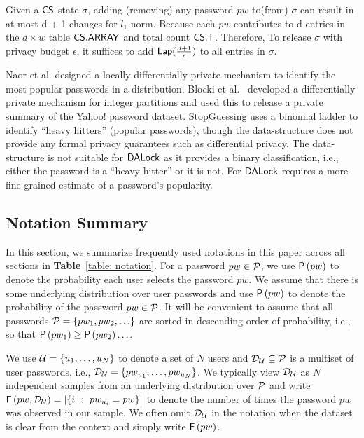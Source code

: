  Given a $\mathsf{CS}$ state $\sigma$, adding (removing) any password $pw$ to(from) $\sigma$ can result in at most d + 1 changes for $l_1$ norm. Because each $pw$ contributes to d entries in the $d \times w$ table $\mathsf{CS.ARRAY}$ and total count $\mathsf{CS.T}$. Therefore, To release $\sigma$ with privacy budget $\epsilon$, it suffices to add $\mathsf{Lap}(\frac{d+1}{\epsilon})$ to all entries in $\sigma$. 


 Naor et al.\cite{CCS:NaoPinRon19} designed a locally differentially private mechanism to identify the most popular passwords in a distribution. Blocki et al.~\cite{NDSS:BloDatBon16} developed a differentially private mechanism for integer partitions and used this to release a private summary of the Yahoo! password dataset. StopGuessing\cite{EuroSP:THS19} uses a binomial ladder to identify ``heavy hitters'' (popular passwords), though the data-structure does not provide any formal privacy guarantees such as differential privacy. The data-structure is not suitable for $\mathsf{DALock}$ as it provides a binary classification, i.e., either the password is a ``heavy hitter'' or it is not. For $\mathsf{DALock}$ requires a more fine-grained estimate of a password’s popularity. 



\subsection{Notation Summary}

In this section, we summarize frequently used notations in this paper across all sections in \textbf{Table}~\ref{table: notation}.  For a password $pw \in \mathcal{P}$, we use $\mathsf{P}\left(pw\right)$ to denote the probability each user selects the password $pw$. We assume that there is some underlying distribution over user passwords and use $\mathsf{P}\left(pw\right)$ to denote the probability of the password $pw \in \mathcal{P}$. It will be convenient to assume that all passwords $ \mathcal{P} = \{pw_1,pw_2,\ldots \}$ are sorted in descending order of probability, i.e., so that $\mathsf{P}\left(pw_1\right) \geq \mathsf{P}\left(pw_2\right) \ldots $. %


We use $\mathcal{U} = \{u_1,\ldots,u_N\}$ to denote a set of $N$ users and $\mathcal{D}_{{\mathcal{U}}} \subseteq \mathcal{P}$ is a multiset of user passwords, i.e., $\mathcal{D}_{{\mathcal{U}}} = \{pw_{u_1},\ldots,pw_{u_N}\}$. We typically view $\mathcal{D}_{{\mathcal{U}}}$ as $N$ independent samples from an underlying distribution over $\mathcal{P}$ and write $\mathsf{F}\left(pw, \mathcal{D}_{{\mathcal{U}}} \right)= \left| \left\{ i ~:~pw_{u_i} = pw \right\} \right|$ to denote the number of times the password $pw$ was observed in our sample. We often omit $\mathcal{D}_{{\mathcal{U}}}$ in the notation when the dataset is clear from the context and simply write $\mathsf{F}\left(pw\right)$. 




